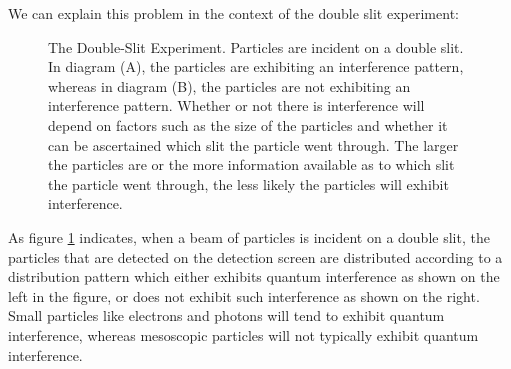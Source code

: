     We can explain this problem in the context of the double slit experiment:
    \begin{figure}[ht!]
    \captionsetup{justification=justified}
    \centering
    \vspace*{10px}
    \caption{The Double-Slit Experiment. Particles are incident on a double slit. In diagram (A), the particles are exhibiting an interference pattern, whereas in diagram (B), the particles are not exhibiting an interference pattern. Whether or not there is interference will depend on factors such as the size of the particles and whether it can be ascertained which slit the particle went through. The larger the particles are or the more information available as to which slit the particle went through, the less likely the particles will exhibit interference.\protect\footnotemark}
    \label{DoubleSlit}
    \end{figure}
    As figure \ref{DoubleSlit} indicates, when a beam of particles is incident on a double slit, the particles that are detected on the detection screen are distributed according to a distribution pattern which either exhibits quantum interference as shown on the left in the figure, or does not exhibit such interference as shown on the right. Small particles like electrons and photons will tend to exhibit quantum interference, whereas mesoscopic particles  will not typically exhibit quantum interference. 
    
